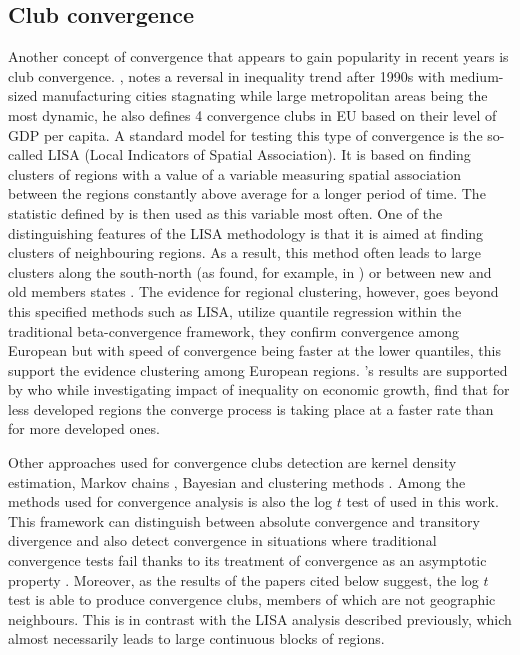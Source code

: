 \documentclass[11pt]{article}
\begin{document}
\subsection{Club convergence} 
 Another concept of convergence that appears to gain popularity in recent years is club convergence. \citet{iammarino2017regional}, notes a reversal in inequality trend after 1990s with medium-sized manufacturing cities stagnating while large metropolitan areas being the most dynamic, he also defines 4 convergence clubs in EU based on their level of GDP per capita.  %
 A standard model for testing this type of convergence is the so-called LISA (Local Indicators of Spatial Association). It is based on finding clusters of regions with a value of a variable measuring spatial association between the regions constantly above average for a longer period of time. The statistic defined by \citet{getis1992analysis} is then used as this variable most often. One of the distinguishing features of the LISA methodology is that it is aimed at finding clusters of neighbouring regions. As a result, this method often leads to large clusters along the south-north  (as found, for example, in \citet{baumont2003spatial}) or between new and old members states \citep{eckey2007convergence}. The evidence for regional clustering, however, goes beyond this specified methods such as LISA, \citet{cartone2021does} utilize quantile regression within the traditional  beta-convergence framework, they confirm convergence among European but with speed of convergence being faster at the lower quantiles, this support the evidence clustering among European regions. \citeauthor{cartone2021does}'s results are supported by \citet{panzera2022impact} who while investigating impact of inequality on economic growth, find that for less developed regions the converge process is taking place at a faster rate than for more developed ones.
 
Other approaches used for convergence clubs detection are kernel density estimation, Markov chains \citep{eckey2007convergence}, Bayesian \citep{fischer2015bayesian} and clustering methods \citep{maasoumi2008economic}. 
Among the methods used for convergence analysis is also the log $t$ test of \citet{phillips2007transition} used in this work. This framework can distinguish between absolute convergence and transitory divergence and also detect convergence in situations where traditional convergence tests fail thanks to its treatment of convergence as an asymptotic property \citep{bartkowska2012regional, borsi2015evolution}.
Moreover, as the results of the papers cited below suggest, the log $t$ test is able to produce convergence clubs, members of which are not geographic neighbours. This is in contrast with the LISA analysis described previously, which almost necessarily leads to large continuous blocks of regions.
\end{document}
